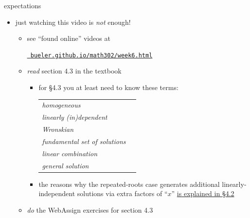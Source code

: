 \documentclass{beamer}
\begin{document}
\begin{frame}{expectations}

\begin{itemize}
\item just watching this video is \emph{not} enough!
     \begin{itemize}
     \item see ``found online'' videos at

     \centerline{\href{https://bueler.github.io/math302/week6.html}{\tt \color{cyan} bueler.github.io/math302/week6.html}}
     \item \emph{read} section 4.3 in the textbook
         \begin{itemize}
         \item for \S4.3 you at least need to know these terms:

\medskip
             \begin{tabular}{ll}
             \emph{homogeneous} \\
             \emph{linearly (in)dependent} \\
             \emph{Wronskian} \\
             \emph{fundamental set of solutions} \\
             \emph{linear combination} \\
             \emph{general solution}
             \end{tabular}

\medskip
         \item the reasons why the repeated-roots case generates additional linearly-independent solutions via extra factors of ``$x$'' \underline{is explained in \S4.2}
         \end{itemize}
     \item \emph{do} the WebAssign exercises for section 4.3
     \end{itemize}
\end{itemize}
\end{frame}
\end{document}
